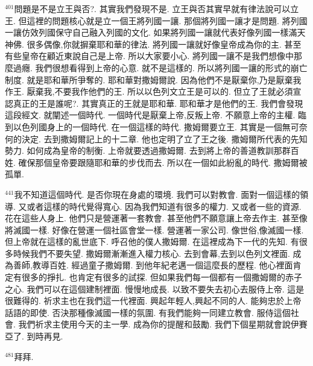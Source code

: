 \documentclass{book}
\begin{document}
$^{401}$問題是不是立王與否?.
其實我們發現不是.
立王與否其實早就有律法說可以立王.
但這裡的問題核心就是立一個王將列國一讓.
那個將列國一讓才是問題.
將列國一讓仿效列國保守自己融入列國的文化.
如果將列國一讓就代表好像列國一樣滿天神佛.
很多偶像,你就摒棄耶和華的律法.
將列國一讓就好像皇帝成為你的主.
甚至有些皇帝在顧近東說自己是上帝.
所以大家要小心.
將列國一讓不是我們想像中那麼過癮.
我們很想看得到上帝的心意.
就不是這樣的.
所以將列國一讓的形式的崩亡制度.
就是耶和華所爭奪的.
耶和華對撒姆爾說.
因為他們不是厭棄你,乃是厭棄我作王.
厭棄我,不要我作他們的王.
所以以色列文立王是可以的.
但立了王就必須宣認真正的王是誰呢?.
其實真正的王就是耶和華.
耶和華才是他們的王.
我們會發現這段經文.
就闡述一個時代.
一個時代是厭棄上帝,反叛上帝.
不願意上帝的主權.
臨到以色列國身上的一個時代.
在一個這樣的時代.
撒姆爾要立王.
其實是一個無可奈何的決定.
去到撒姆爾記上的十二章.
他也定明了立了王之後.
撒姆爾所代表的先知勢力.
如何成為皇帝的制衡.
上帝就要透過撒姆爾.
去到將上帝的善道教訓那群百姓.
確保那個皇帝要跟隨耶和華的步伐而去.
所以在一個如此紛亂的時代.
撒姆爾被孤單.

$^{441}$我不知道這個時代.
是否你現在身處的環境.
我們可以對教會.
面對一個這樣的領導.
又或者這樣的時代覺得寬心.
因為我們知道有很多的權力.
又或者一些的資源.
花在這些人身上.
他們只是營運著一套教會.
甚至他們不願意讓上帝去作主.
甚至像將滅國一樣.
好像在營運一個社區會堂一樣.
營運著一家公司.
像世俗,像滅國一樣.
但上帝就在這樣的亂世底下.
呼召他的僕人撒姆爾.
在這裡成為下一代的先知.
有很多時候我們不要失望.
撒姆爾漸漸進入權力核心.
去到會幕,去到以色列文裡面.
成為善師,教導百姓.
經過童子撒姆爾.
到他年紀老邁一個這麼長的歷程.
他心裡面肯定有很多的掙扎.
也肯定有很多的試探.
但如果我們每一個都有一個撒姆爾的赤子之心.
我們可以在這個建制裡面.
慢慢地成長.
以致不要失去初心去服侍上帝.
這是很難得的.
祈求主也在我們這一代裡面.
興起年輕人,興起不同的人.
能夠忠於上帝話語的即使.
否決那種像滅國一樣的氛圍.
有我們能夠一同建立教會.
服侍這個社會.
我們祈求主使用今天的主一學.
成為你的提醒和鼓勵.
我們下個星期就會說伊賽亞了.
到時再見.

$^{481}$拜拜.
\newpage
\end{document}
